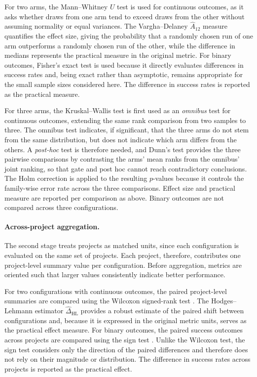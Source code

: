 For two arms, the Mann--Whitney $U$ test \cite{mann1947} is used for continuous outcomes, as it asks whether draws from one arm tend to exceed draws from the other without assuming normality or equal variances.
The Vargha--Delaney $\hat{A}_{12}$ measure \cite{vargha2000} quantifies the effect size, giving the probability that a randomly chosen run of one arm outperforms a randomly chosen run of the other, while the difference in medians represents the practical measure in the original metric.
For binary outcomes, Fisher's exact test \cite{fisher1922} is used because it directly evaluates differences in success rates and, being exact rather than asymptotic, remains appropriate for the small sample sizes considered here.
The difference in success rates is reported as the practical measure.

For three arms, the Kruskal--Wallis test \cite{kruskal1952} is first used as an \emph{omnibus} test for continuous outcomes, extending the same rank comparison from two samples to three.
The omnibus test indicates, if significant, that the three arms do not stem from the same distribution, but does not indicate which arm differs from the others.
A \emph{post-hoc} test is therefore needed, and Dunn's test \cite{dunn1964} provides the three pairwise comparisons by contrasting the arms' mean ranks from the omnibus' joint ranking, so that gate and post hoc cannot reach contradictory conclusions.
The Holm correction \cite{holm1979} is applied to the resulting $p$-values because it controls the family-wise error rate across the three comparisons.
Effect size and practical measure are reported per comparison as above.
Binary outcomes are not compared across three configurations.

\paragraph{Across-project aggregation.}
The second stage treats projects as matched units, since each configuration is evaluated on the same set of projects.
Each project, therefore, contributes one project-level summary value per configuration.
Before aggregation, metrics are oriented such that larger values consistently indicate better performance.

For two configurations with continuous outcomes, the paired project-level summaries are compared using the Wilcoxon signed-rank test \cite{wilcoxon1945}.
The Hodges--Lehmann estimator $\hat{\Delta}_{\mathrm{HL}}$ \cite{hodges1963} provides a robust estimate of the paired shift between configurations and, because it is expressed in the original metric units, serves as the practical effect measure.
For binary outcomes, the paired success outcomes across projects are compared using the sign test \cite{dixon1946}.
Unlike the Wilcoxon test, the sign test considers only the direction of the paired differences and therefore does not rely on their magnitude or distribution.
The difference in success rates across projects is reported as the practical effect.

